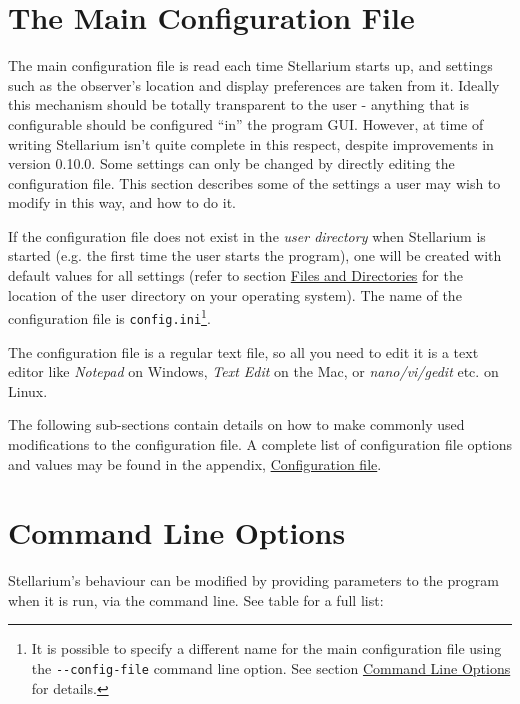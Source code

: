 \chapter{The Main Configuration File}\label{the-main-configuration-file}
\label{sec:ConfigurationFile}

The main configuration file is read each time Stellarium starts up, and
settings such as the observer's location and display preferences are
taken from it. Ideally this mechanism should be totally transparent to
the user - anything that is configurable should be configured ``in'' the
program GUI. However, at time of writing Stellarium isn't quite complete
in this respect, despite improvements in version 0.10.0. Some settings
can only be changed by directly editing the configuration file. This
section describes some of the settings a user may wish to modify in this
way, and how to do it.

If the configuration file does not exist in the \emph{user directory}
when Stellarium is started (e.g. the first time the user starts the
program), one will be created with default values for all settings
(refer to section \href{Advanced_Use\#Files_and_Directories}{Files and
Directories} for the location of the user directory on your operating
system). The name of the configuration file is
\texttt{config.ini}\footnote{It is possible to specify a different name
  for the main configuration file using the \texttt{-\/-config-file}
  command line option. See section
  \href{Advanced_Use\#Command_Line_Options}{Command Line Options} for
  details.}.

The configuration file is a regular text file, so all you need to edit
it is a text editor like \emph{Notepad} on Windows, \emph{Text Edit} on
the Mac, or \emph{nano/vi/gedit} etc. on Linux.

The following sub-sections contain details on how to make commonly used
modifications to the configuration file. A complete list of
configuration file options and values may be found in the appendix,
\href{Configuration_file}{Configuration file}.

\chapter{Command Line Options}\label{command-line-options}
\label{sec:CommandLineOptions}

Stellarium's behaviour can be modified by providing parameters to the
program when it is run, via the command line. See table for a full list:

